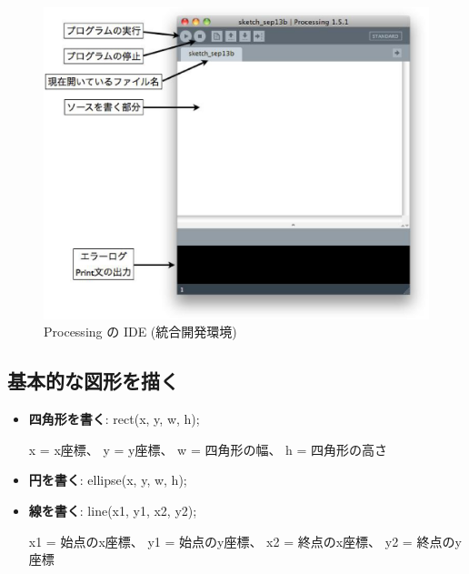 \documentclass[11pt,a4paper]{jarticle}
\begin{document}
\begin{figure}[h]
 \centering
 \includegraphics[width=0.5\columnwidth]{img/processing_ide.eps}
 \caption{Processing の IDE (統合開発環境)}
\end{figure}

\subsection*{基本的な図形を描く}

\begin{itemize}
 \item \textbf{四角形を書く}: rect(x, y, w, h);

       x = x座標、
       y = y座標、
       w = 四角形の幅、
       h = 四角形の高さ

 \item \textbf{円を書く}: ellipse(x, y, w, h);
 \item \textbf{線を書く}: line(x1, y1, x2, y2);
       
       x1 = 始点のx座標、
       y1 = 始点のy座標、
       x2 = 終点のx座標、
       y2 = 終点のy座標

\end{itemize}
\end{document}
